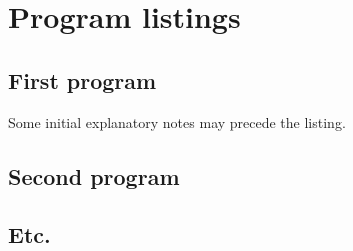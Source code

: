 \chapter{Program listings}

\section{First program}

Some initial explanatory notes may precede the listing.

\section{Second program}

\section{Etc.}
